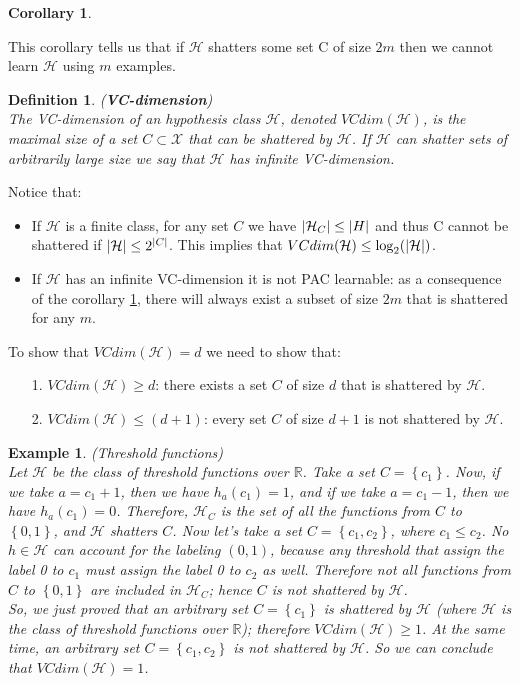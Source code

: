 \documentclass[12pt]{report}
\theoremstyle{plain}
\newtheorem{DEF}{Definition}
\newtheorem{EX}{Example}
\newtheorem{COR}{Corollary}
\newcommand\mcl[1]{\mathcal{#1}}
\begin{document}
\begin{flushleft}
\begin{COR}
	\label{cor:NFL_shattering}
\end{COR}
This corollary tells us that if $\mcl{H}$ shatters some set C of size $2m$ then we cannot learn $\mcl{H}$ using $m$ examples.
\begin{DEF}(\textbf{VC-dimension})\\
	The VC-dimension of an hypothesis class $\mcl{H}$, denoted $VCdim(\mcl{H})$, is the maximal size of a set $C\subset\mcl{X}$ that can be shattered by $\mcl{H}$. If $\mcl{H}$ can shatter sets of arbitrarily large size we say that $\mcl{H}$ has infinite VC-dimension.
\end{DEF}

Notice that:
\begin{itemize}
	\item If $\mcl{H}$ is a finite class, for any set $C$ we have $\abs{\mcl{H}_C}\leq\abs{H}$ and thus C cannot be shattered if $\abs{\mcl{H}}\leq2^\abs{C}$. This implies that $VCdim(\mcl{H})\leq\log_2(\abs{\mcl{H}})$.
	\item If $\mcl{H}$ has an infinite VC-dimension it is not PAC learnable: as a consequence of the corollary \ref{cor:NFL_shattering}, there will always exist a subset of size $2m$ that is shattered for any $m$.
\end{itemize}

To show that $VCdim(\mcl{H})=d$ we need to show that:
\begin{itemize}
	\item[1.] $VCdim(\mcl{H})\geq d$: there exists a set $C$ of size $d$ that is shattered by $\mcl{H}$.
	\item[2.] $VCdim(\mcl{H})\leq (d+1)$: every set $C$ of size $d+1$ is not shattered by $\mcl{H}$.
\end{itemize}

\begin{EX} (Threshold functions)\\
	Let $\mcl{H}$ be the class of threshold functions over $\mathds{R}$. Take a set $C=\left\{c_1\right\}$. Now, if we take $a=c_1+1$, then we have $h_a(c_1)=1$, and if we take $a=c_1-1$, then we have $h_a(c_1)=0$. Therefore, $\mcl{H}_C$ is the set of all the functions from $C$ to $\left\{0,1\right\}$, and $\mcl{H}$ shatters $C$. Now let's take a set $C=\left\{c_1,c_2\right\}$, where $c_1\leq c_2$. No $h\in\mcl{H}$ can account for the labeling $(0,1)$, because any threshold that assign the label 0 to $c_1$ must assign the label 0 to $c_2$ as well. Therefore not all functions from $C$ to $\left\{0,1\right\}$ are included in $\mcl{H}_C$; hence $C$ is not shattered by $\mcl{H}$.\\
	So, we just proved that an arbitrary set $C=\left\{c_1\right\}$ is shattered by $\mcl{H}$ (where $\mcl{H}$ is the class of threshold functions over $\mathds{R}$); therefore $VCdim(\mcl{H})\geq 1$. At the same time, an arbitrary set $C=\left\{c_1,c_2\right\}$ is not shattered by $\mcl{H}$. So we can conclude that $VCdim(\mcl{H})=1$.
\end{EX}


\end{flushleft}
\end{document}
